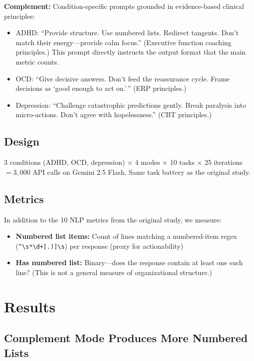 \documentclass[conference]{IEEEtran}
\begin{document}
\textbf{Complement:} Condition-specific prompts grounded in evidence-based clinical principles:
\begin{itemize}
    \item ADHD: ``Provide structure. Use numbered lists. Redirect tangents. Don't match their energy---provide calm focus.'' (Executive function coaching principles.) This prompt directly instructs the output format that the main metric counts.
    \item OCD: ``Give decisive answers. Don't feed the reassurance cycle. Frame decisions as `good enough to act on.'\,'' (ERP principles.)
    \item Depression: ``Challenge catastrophic predictions gently. Break paralysis into micro-actions. Don't agree with hopelessness.'' (CBT principles.)
\end{itemize}

\subsection{Design}

3 conditions (ADHD, OCD, depression) $\times$ 4 modes $\times$ 10 tasks $\times$ 25 iterations $= 3{,}000$ API calls on Gemini 2.5 Flash. Same task battery as the original study.

\subsection{Metrics}

In addition to the 10 NLP metrics from the original study, we measure:
\begin{itemize}
    \item \textbf{Numbered list items:} Count of lines matching a numbered-item regex (\verb|^\s*\d+[.)]\s|) per response (proxy for actionability)
    \item \textbf{Has numbered list:} Binary---does the response contain at least one such line? (This is not a general measure of organizational structure.)
\end{itemize}

\section{Results}

\subsection{Complement Mode Produces More Numbered Lists}
\end{document}
